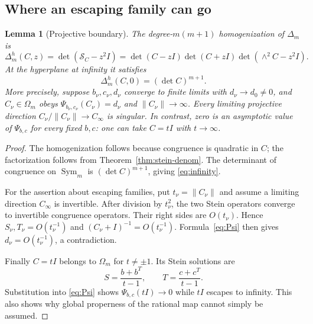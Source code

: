 \documentclass[11pt]{article}
\newtheorem{lemma}[theorem]{Lemma}
\theoremstyle{remark}\newtheorem{remark}[theorem]{Remark}
\DeclareMathOperator{\Sym}{Sym}
\begin{document}
\subsection{Where an escaping family can go}
\begin{lemma}[Projective boundary]\label{lem:infinity}
The degree-$m(m+1)$ homogenization of $\Delta_m$ is
\[
\Delta_m^h(C,z)=\det(\mathcal S_C-z^2I)
=\det(C-zI)\det(C+zI)\det(\wedge^2C-z^2I).
\]
At the hyperplane at infinity it satisfies
\begin{equation}\label{eq:infinity}
\boxed{\Delta_m^h(C,0)=(\det C)^{m+1}.}
\end{equation}
More precisely, suppose $b_\nu,c_\nu,d_\nu$ converge to finite limits with $d_\nu\to d_0\ne0$, and $C_\nu\in\Omega_m$ obeys $\Psi_{b_\nu,c_\nu}(C_\nu)=d_\nu$ and $\|C_\nu\|\to\infty$. Every limiting projective direction $C_\nu/\|C_\nu\|\to C_\infty$ is singular. In contrast, zero is an asymptotic value of $\Psi_{b,c}$ for every fixed $b,c$: one can take $C=tI$ with $t\to\infty$.
\end{lemma}
\begin{proof}
The homogenization follows because congruence is quadratic in $C$; the factorization follows from Theorem~\ref{thm:stein-denom}. The determinant of congruence on $\Sym_m$ is $(\det C)^{m+1}$, giving \eqref{eq:infinity}.

For the assertion about escaping families, put $t_\nu=\|C_\nu\|$ and assume a limiting direction $C_\infty$ is invertible. After division by $t_\nu^2$, the two Stein operators converge to invertible congruence operators. Their right sides are $O(t_\nu)$. Hence $S_\nu,T_\nu=O(t_\nu^{-1})$ and $(C_\nu+I)^{-1}=O(t_\nu^{-1})$. Formula~\eqref{eq:Psi} then gives $d_\nu=O(t_\nu^{-1})$, a contradiction.

Finally $C=tI$ belongs to $\Omega_m$ for $t\ne\pm1$. Its Stein solutions are
\[
S=\frac{b+b^T}{t-1},\qquad T=\frac{c+c^T}{t-1}.
\]
Substitution into \eqref{eq:Psi} shows $\Psi_{b,c}(tI)\to0$ while $tI$ escapes to infinity. This also shows why global properness of the rational map cannot simply be assumed.
\end{proof}
\end{document}
